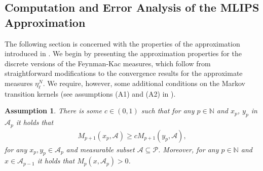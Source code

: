 \documentclass{article}
\newtheorem{lemma}[theorem]{Lemma}
\newtheorem{assumption}[theorem]{Assumption}
\newcommand{\cA}{\mathcal{A}}
\newcommand{\cP}{\mathcal{P}}
\newcommand{\cN}{\mathcal{N}}
\newcommand{\IE}{\mathbb{E}}
\newcommand{\IN}{\mathbb{N}}
\newcommand{\IR}{\mathbb{R}}
\newcommand{\abs}[1]{{\left\vert #1 \right\vert}}
\theoremstyle{definition}
\begin{document}
\subsection{Computation and Error Analysis of the MLIPS Approximation}
\label{sec:MLIPSerrors}
The following section is concerned with the properties of the approximation introduced in
. We begin by presenting the approximation properties for the discrete versions of the
Feynman-Kac measures, which follow from straightforward modifications to the convergence results for
the approximate measures $\eta_\ell^N$. We require, however, some additional conditions on
the Markov transition kernels (see assumptions (A1) and (A2) in \cite{beskosMultilevelSequentialMonte2017,moralMultilevelSequentialMonte2017}).

\begin{assumption}
  \label{as:Mm}
  There is some $c\in(0,1)$ such that for any $p\in\IN$ and $x_p$, $y_p$ in $\cA_p$ it holds that
  \begin{align*}
    M_{p+1}(x_p, \cA) \geq c M_{p+1}(y_p, \cA),
  \end{align*}
  for any $x_p, y_p\in\cA_p$ and measurable subset $\cA\subseteq\cP$.
  Moreover, for any $p\in\IN$ and $x\in\cA_{p-1}$ it holds that $M_p(x,\cA_p)>0$.
\end{assumption}

\end{document}
